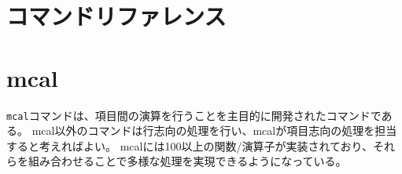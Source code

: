 \documentclass[a4paper]{jsbook}
\begin{document}
\chapter{コマンドリファレンス}
















































































%













\chapter{mcal\label{chapter:mcal}}
\verb|mcal|コマンドは、項目間の演算を行うことを主目的に開発されたコマンドである。
mcal以外のコマンドは行志向の処理を行い、mcalが項目志向の処理を担当すると考えればよい。
mcalには100以上の関数/演算子が実装されており、それらを組み合わせることで多様な処理を実現できるようになっている。
\end{document}
